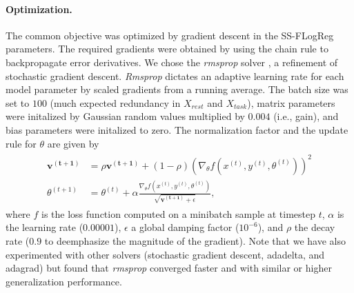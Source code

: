 \documentclass{article} %
\begin{document}
\paragraph{Optimization.}
The common objective was optimized
by gradient descent in the SS-FLogReg parameters.
%
The required gradients were obtained by using the chain rule to
backpropagate error derivatives.
We chose the \textit{rmsprop} solver \cite{rmsprop},
a refinement of stochastic gradient descent.
\textit{Rmsprop} dictates an adaptive learning rate
for each model parameter by
scaled gradients from a running average.
The batch size was set to $100$
(much expected redundancy in $X_{rest}$ and $X_{task}$),
matrix parameters were initalized by Gaussian random values multiplied
by $0.004$ (i.e., gain), and
bias parameters were initalized to zero.
%
The normalization factor and the update rule for $\theta$
are given by
%
\begin{eqnarray}
  \begin{split}
    \mathbf{v^{(t+1)}} &= \rho \mathbf{v^{(t+1)}} + (1 - \rho)\left(\nabla_{\theta} f(x^{(t)}, y^{(t)}, \theta^{(t)})\right)^2
\\
\theta^{(t+1)} &= \theta^{(t)} + \alpha \frac{\nabla_{\theta} f(x^{(t)}, y^{(t)}, \theta^{(t)})}{\sqrt{\mathbf{v^{(t+1)}} + \epsilon}},
  \end{split}
\end{eqnarray}
where $f$ is the loss function computed on a minibatch sample at timestep $t$,
$\alpha$ is the learning rate ($0.00001$),
$\epsilon$ a global damping factor ($10^{-6}$),
and
$\rho$ the decay rate ($0.9$ to deemphasize the magnitude of the gradient).
%
Note that we have also experimented with other solvers
(stochastic gradient descent, adadelta, and adagrad) but found that
\textit{rmsprop} converged faster and with
similar or higher generalization performance.
\end{document}
